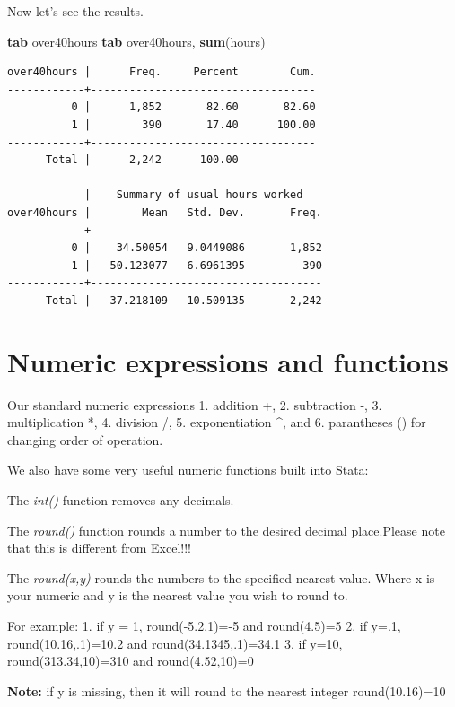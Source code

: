 \documentclass[
]{book}
\newenvironment{Shaded}{\begin{snugshade}}{\end{snugshade}}
\newcommand{\KeywordTok}[1]{\textcolor[rgb]{0.13,0.29,0.53}{\textbf{#1}}}
\newcommand{\NormalTok}[1]{#1}
\begin{document}
Now let's see the results.

\begin{Shaded}
\begin{Highlighting}[]
\KeywordTok{tab}\NormalTok{ over40hours}
\KeywordTok{tab}\NormalTok{ over40hours, }\KeywordTok{sum}\NormalTok{(hours)}
\end{Highlighting}
\end{Shaded}

\begin{verbatim}
over40hours |      Freq.     Percent        Cum.
------------+-----------------------------------
          0 |      1,852       82.60       82.60
          1 |        390       17.40      100.00
------------+-----------------------------------
      Total |      2,242      100.00

            |    Summary of usual hours worked
over40hours |        Mean   Std. Dev.       Freq.
------------+------------------------------------
          0 |    34.50054   9.0449086       1,852
          1 |   50.123077   6.6961395         390
------------+------------------------------------
      Total |   37.218109   10.509135       2,242
\end{verbatim}

\section{Numeric expressions and functions}\label{numeric-expressions-and-functions}

Our standard numeric expressions
1. addition +,
2. subtraction -,
3. multiplication *,
4. division /,
5. exponentiation \^{}, and
6. parantheses () for changing order of operation.

We also have some very useful numeric functions built into Stata:

The \emph{int()} function removes any decimals.

The \emph{round()} function rounds a number to the desired decimal place.Please note that this is different from Excel!!!

The \emph{round(x,y)} rounds the numbers to the specified nearest value. Where x is your numeric and y is the nearest value you wish to round to.

For example:
1. if y = 1, round(-5.2,1)=-5 and round(4.5)=5
2. if y=.1, round(10.16,.1)=10.2 and round(34.1345,.1)=34.1
3. if y=10, round(313.34,10)=310 and round(4.52,10)=0

\textbf{Note:} if y is missing, then it will round to the nearest integer round(10.16)=10
\end{document}
